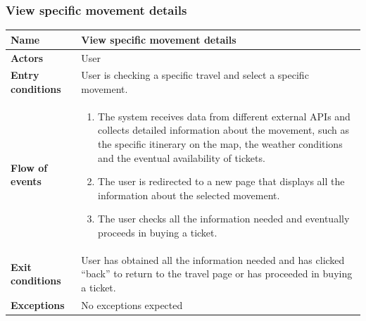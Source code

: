 \subsubsection{View specific movement details}
\begin{table}[!h]
	\centering
	{\renewcommand{\arraystretch}{2}%
		\begin{tabular}{|l|p{12cm}|}
			\hline
			\textbf{Name} 				& \textbf{View specific movement details} \\ \hline
			\textbf{Actors} 			& User \\ \hline
			\textbf{Entry conditions} 	& User is checking a specific travel and select a specific movement. \\ \hline
			\textbf{Flow of events}		& \begin{minipage}[t]{0.75\textwidth}
				\begin{enumerate}
					\item The system receives data from different external APIs and collects detailed information about the movement, such as the specific itinerary on the map, the weather conditions and the eventual availability of tickets.
					\item The user is redirected to a new page that displays all the information about the selected movement.
					\item The user checks all the information needed and eventually proceeds in buying a ticket.
				\end{enumerate}
			\end{minipage}	\\ \hline
			\textbf{Exit conditions}	& User has obtained all the information needed and has clicked “back” to return to the travel page or has proceeded in buying a ticket.  \\ \hline
			\textbf{Exceptions}			& No exceptions expected  \\ \hline
	\end{tabular}}
\end{table}

